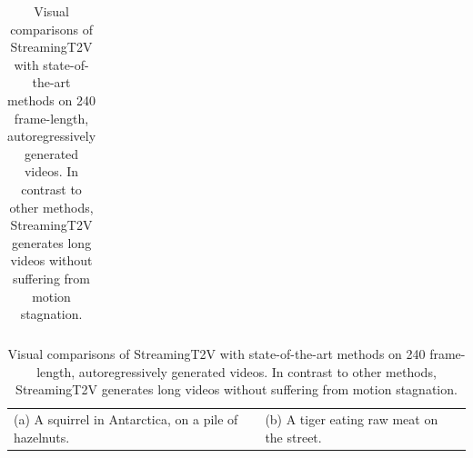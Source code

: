 \begin{table}[t]
\begin{tabularx}{\textwidth}{*{5}{X} b{0.001mm} *{5}{X} b{0.005mm}}
    \end{tabularx}
        
    \vspace{1mm}
    
    \begin{tabularx}{\textwidth}{*{1}{X} b{0.001mm} *{1}{X} b{0.005mm}}
        (a) A squirrel in Antarctica, on a pile of hazelnuts. & & (b) A tiger eating raw meat on the street. &
    \end{tabularx}
    
    
    \caption{Visual comparisons of StreamingT2V with state-of-the-art methods on 240 frame-length, autoregressively generated videos. In contrast to other methods, StreamingT2V generates long videos without suffering from motion stagnation.
    }
    \label{fig:comparison-to-sota}
    \vspace{-10pt}
\end{table}

\egroup
\setcounter{figure}{\value{table}}